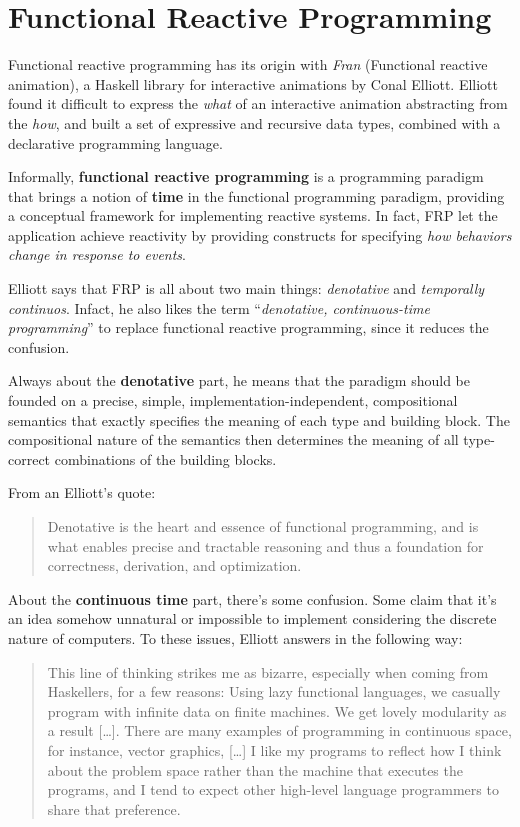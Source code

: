 \section{Functional Reactive
Programming}\label{functional-reactive-programming}

Functional reactive programming has its origin with \emph{Fran}
(Functional reactive animation), a Haskell library for interactive
animations by Conal Elliott. Elliott found it difficult to express the
\emph{what} of an interactive animation abstracting from the \emph{how},
and built a set of expressive and recursive data types, combined with a
declarative programming language.

Informally, \textbf{functional reactive programming} is a programming
paradigm that brings a notion of \textbf{time} in the functional
programming paradigm, providing a conceptual framework for implementing
reactive systems. In fact, FRP let the application achieve reactivity by
providing constructs for specifying \emph{how behaviors change in
response to events}.

Elliott says that FRP is all about two main things: \emph{denotative}
and \emph{temporally continuos}. Infact, he also likes the term
``\emph{denotative, continuous-time programming}'' to replace functional
reactive programming, since it reduces the confusion.

Always about the \textbf{denotative} part, he means that the paradigm
should be founded on a precise, simple, implementation-independent,
compositional semantics that exactly specifies the meaning of each type
and building block. The compositional nature of the semantics then
determines the meaning of all type-correct combinations of the building
blocks.

From an Elliott's quote: 

\begin{quote}
Denotative is the heart and
essence of functional programming, and is what enables precise and
tractable reasoning and thus a foundation for correctness, derivation,
and optimization.
\end{quote}

About the \textbf{continuous time} part, there's some confusion. Some
claim that it's an idea somehow unnatural or impossible to implement
considering the discrete nature of computers. To these issues, Elliott
answers in the following way:

\begin{quote}
This line of thinking strikes me as bizarre, especially when coming from
Haskellers, for a few reasons: Using lazy functional languages, we
casually program with infinite data on finite machines. We get lovely
modularity as a result {[}\ldots{}{]}. There are many examples of
programming in continuous space, for instance, vector graphics,
{[}\ldots{}{]} I like my programs to reflect how I think about the
problem space rather than the machine that executes the programs, and I
tend to expect other high-level language programmers to share that
preference.
\end{quote}

